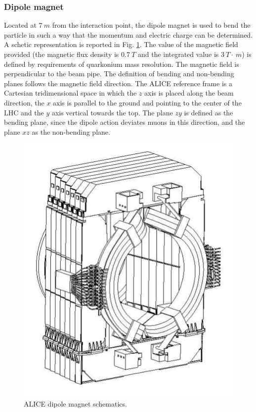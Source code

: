 \subsubsection{Dipole magnet}
Located at $7\ m$ from the interaction point, the dipole magnet is used to bend the particle in such a way that the momentum and electric charge can be determined.
A schetic representation is reported in Fig. \ref{fig:dipole}.
The value of the magnetic field provided (the magnetic flux density is $0.7\ T$ and the integrated value is $3\ T\cdot~m$) is defined by requirements of quarkonium mass resolution.
The magnetic field is perpendicular to the beam pipe.
The definition of bending and non-bending planes follows the magnetic field direction.
The ALICE reference frame is a Cartesian tridimensional space in which the $z$ axis is placed along the beam direction, the $x$ axis is parallel to the ground and pointing to the center of the LHC and the $y$ axis vertical towards the top.
The plane $zy$ is defined as the bending plane, since the dipole action deviates muons in this direction, and the plane $xz$ as the non-bending plane.

\begin{figure}[!h]
\begin{center}
\includegraphics[width=0.6\linewidth]{Chapters/Introduction/Figs/dipole.png}
\caption{ALICE dipole magnet schematics.}
\label{fig:dipole}
\end{center}
\end{figure}

